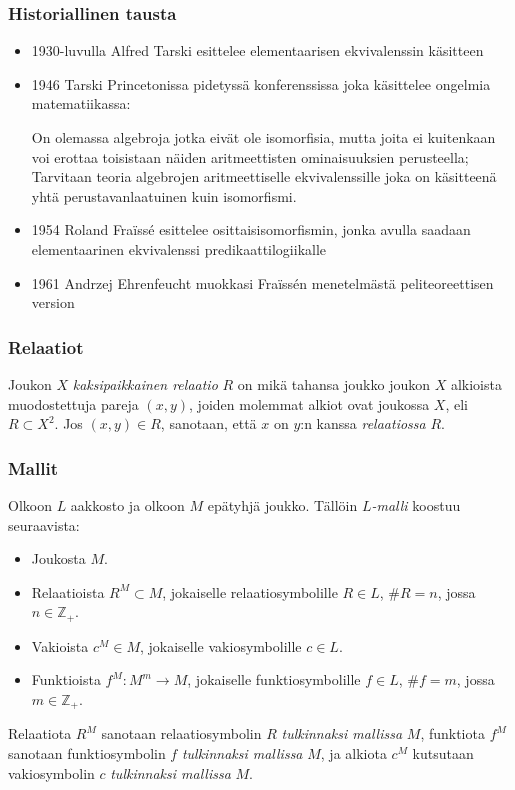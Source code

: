 \documentclass{beamer}
\begin{document}
\begin{frame}
\frametitle{Historiallinen tausta}
\begin{itemize}
\item<1->1930-luvulla Alfred Tarski esittelee elementaarisen ekvivalenssin käsitteen
\item<2->1946 Tarski Princetonissa pidetyssä konferenssissa joka käsittelee ongelmia matematiikassa:

On olemassa algebroja jotka eivät ole isomorfisia, mutta joita ei kuitenkaan voi erottaa toisistaan näiden aritmeettisten ominaisuuksien perusteella; Tarvitaan teoria algebrojen aritmeettiselle ekvivalenssille joka on käsitteenä yhtä perustavanlaatuinen kuin isomorfismi.
\item<3->1954 Roland Fraïssé esittelee osittaisisomorfismin, jonka avulla saadaan elementaarinen ekvivalenssi predikaattilogiikalle
\item<4->1961 Andrzej Ehrenfeucht muokkasi Fraïssén menetelmästä peliteoreettisen version
\end{itemize}
\end{frame}

\begin{frame}
\frametitle{Relaatiot}
Joukon $X$ \textit{kaksipaikkainen relaatio} $R$ on mikä tahansa joukko joukon $X$ alkioista muodostettuja pareja $(x, y)$, joiden molemmat alkiot ovat joukossa $X$, eli $R \subset X^2$. \pause Jos $(x, y) \in R$, sanotaan, että $x$ on $y$:n kanssa \textit{relaatiossa} $R$.
\end{frame}

\begin{frame}
\frametitle{Mallit}
Olkoon $L$ aakkosto ja olkoon $M$ epätyhjä joukko. Tällöin $L$\textit{-malli} koostuu seuraavista:
\begin{itemize}
\item<1-> Joukosta $M$.
\item<2-> Relaatioista $R^M \subset M$, jokaiselle relaatiosymbolille $R \in L$, $\#R = n$, jossa $n\in \mathbb{Z}_+$.
\item<3-> Vakioista $c^M \in M$, jokaiselle vakiosymbolille $c \in L$.
\item<4-> Funktioista $f^M: M^m \rightarrow M$, jokaiselle funktiosymbolille $f \in L$, $\#f = m$, jossa $m\in \mathbb{Z}_+$.
\end{itemize}
\pause \pause \pause \pause
Relaatiota $R^M$ sanotaan relaatiosymbolin $R$ \textit{tulkinnaksi mallissa} $M$, funktiota $f^M$ sanotaan funktiosymbolin $f$ \textit{tulkinnaksi mallissa} $M$, ja alkiota $c^M$ kutsutaan vakiosymbolin $c$ \textit{tulkinnaksi mallissa} $M$.
\end{frame}
\end{document}
